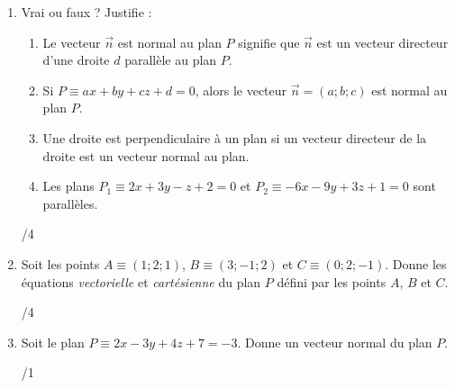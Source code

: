 \begin{enumerate}
		\item 
			\begin{minipage}[t]{.9\textwidth}
				Vrai ou faux ? Justifie :
				\begin{enumerate}
					\item Le vecteur $\vec{n}$ est normal au plan $P$ signifie que $\vec{n}$ est un vecteur directeur d'une droite $d$ parallèle au plan $P$.
					\item Si $P \equiv ax + by +cz + d = 0$, alors le vecteur $\vec{n} = \left(a; b; c\right)$ est normal au plan $P$.
					\item Une droite est perpendiculaire à un plan si un vecteur directeur de la droite est un vecteur normal au plan.
					\item Les plans $P_1 \equiv 2x + 3y - z + 2 = 0$ et $P_2 \equiv -6x - 9y + 3z + 1 = 0$ sont parallèles.
				\end{enumerate}
			\end{minipage}%
			\begin{minipage}{.1\textwidth}
				\begin{flushright}
					{\large /4}
				\end{flushright}
			\end{minipage}
			\vspace{1em}
		
		\item 
			\begin{minipage}[t]{.9\textwidth}
				Soit les points $A \equiv \left(1; 2; 1\right)$, $B \equiv \left(3; -1; 2\right)$ et $C \equiv \left(0; 2; -1\right)$. Donne les équations \textit{vectorielle} et \textit{cartésienne} du plan $P$ défini par les points $A$, $B$ et $C$.
			\end{minipage}%
			\begin{minipage}{.1\textwidth}
				\begin{flushright}
					{\large /4}
				\end{flushright}
			\end{minipage}
			\vspace{1em}
		
		\item 
			\begin{minipage}[t]{.9\textwidth}
				Soit le plan $P \equiv 2x - 3y + 4z + 7 = -3$. Donne un vecteur normal du plan $P$.
			\end{minipage}%
			\begin{minipage}{.1\textwidth}
				\begin{flushright}
					{\large /1}
				\end{flushright}
			\end{minipage}
			\vspace{1em}
			

\end{enumerate}
